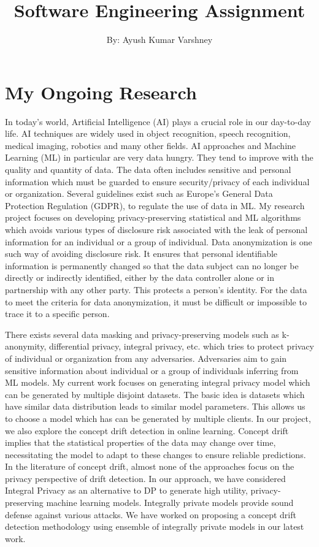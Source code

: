 \documentclass{article}
\title{Software Engineering Assignment}
\author{By: Ayush Kumar Varshney }
\date{}
\begin{document}
\maketitle

\section{My Ongoing Research}

In today's world, Artificial Intelligence (AI) plays a crucial role in our day-to-day life. AI techniques are widely used in object recognition, speech recognition, medical imaging, robotics and many other fields. AI approaches and Machine Learning (ML) in particular are very data hungry. They tend to improve with the quality and quantity of data. The data often includes sensitive and personal information which must be guarded to ensure security/privacy of each individual or organization. Several guidelines exist such as Europe's General Data Protection Regulation (GDPR), to regulate the use of data in ML. My research project focuses on developing privacy-preserving statistical and ML algorithms which avoids various types of disclosure risk associated with the leak of personal information for an individual or a group of individual. Data anonymization is one such way of avoiding disclosure risk. It ensures that personal identifiable information is permanently changed so that the data subject can no longer be directly or indirectly identified, either by the data controller alone or in partnership with any other party. This protects a person's identity. For the data to meet the criteria for data anonymization, it must be difficult or impossible to trace it to a specific person. 

There exists several data masking and privacy-preserving models such as k-anonymity, differential privacy, integral privacy, etc. which tries to protect privacy of individual or organization from any adversaries. Adversaries aim to gain sensitive information about individual or a group of individuals inferring from ML models. My current work focuses on generating integral privacy model which can be generated by multiple disjoint datasets. The basic idea is datasets which have similar data distribution leads to similar model parameters. This allows us to choose a model which has can be generated by multiple clients. In our project, we also explore the concept drift detection in online learning. Concept drift implies that the statistical properties of the data may change over time, necessitating the model to adapt to these changes to ensure reliable predictions. In the literature of concept drift, almost none of the approaches focus on the privacy perspective of drift detection. In our approach, we have considered Integral Privacy as an alternative to DP to generate high utility, privacy-preserving machine learning models. Integrally private models provide sound defense against various attacks.  We have worked on proposing a concept drift detection methodology using ensemble of integrally private models in our latest work.
\end{document}
